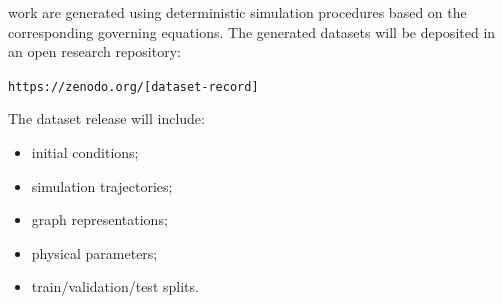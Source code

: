 work are generated using deterministic simulation procedures based on the corresponding governing equations. The generated datasets will be deposited in an open research repository: \begin{center} \texttt{https://zenodo.org/[dataset-record]} \end{center} The dataset release will include: \begin{itemize} \item initial conditions; \item simulation trajectories; \item graph representations; \item physical parameters; \item train/validation/test splits. \end{itemize} %